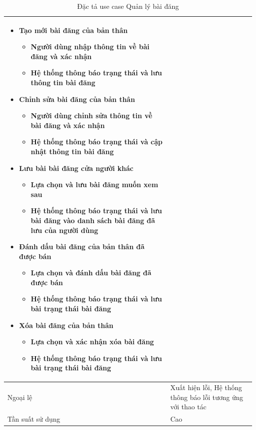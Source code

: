 \documentclass[../DoAn.tex]{subfiles}
\begin{document}
\begin{table}[H]
\begin{tabular}{|p{3cm}|p{12cm}|}
\begin{itemize}
\item Tạo mới bài đăng của bản thân
\begin{itemize}
\item Người dùng nhập thông tin về bài đăng và xác nhận
\item Hệ thống thông báo trạng thái và lưu thông tin bài đăng
\end{itemize}
\item Chỉnh sửa bài đăng của bản thân
\begin{itemize}
\item Người dùng chỉnh sửa thông tin về bài đăng và xác nhận
\item Hệ thống thông báo trạng thái và cập nhật thông tin bài đăng
\end{itemize}
\item Lưu bài bài đăng cửa người khác
\begin{itemize}
\item Lựa chọn và lưu bài đăng muốn xem sau
\item Hệ thống thông báo trạng thái và lưu bài đăng vào danh sách bài đăng đã lưu của người dùng
\end{itemize}
\item Đánh dấu bài đăng của bản thân đã được bán
\begin{itemize}
\item Lựa chọn và đánh dấu bài đăng đã được bán
\item Hệ thống thông báo trạng thái và lưu bài trạng thái bài đăng
\end{itemize}
\item Xóa bài đăng của bản thân
\begin{itemize}
\item Lựa chọn và xác nhận xóa bài đăng
\item Hệ thống thông báo trạng thái và lưu bài trạng thái bài đăng
\end{itemize}
\end{itemize}                                 \\ \hline
Ngoại lệ            & Xuất hiện lỗi, Hệ thống thông báo lỗi tương ứng với thao tác                                                                                             \\ \hline
Tần suất sử dụng    & Cao                                                                                                                \\ \hline
\end{tabular}
\caption{Đặc tả use case Quản lý bài đăng}
\label{tab:my-table}
\end{table}
\newpage
\end{document}
